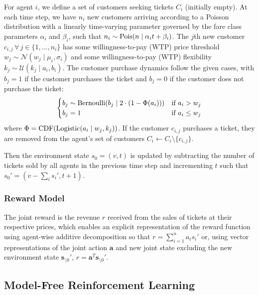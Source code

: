 \documentclass[letterpaper]{article}%
\begin{document}
For agent $i$, we define a set of customers seeking tickets $C_i$ (initially empty). At each time step, we have $n_i$ new customers arriving according to a Poisson distribution with a linearly time-varying parameter governed by the fare class parameters $\alpha_i$ and $\beta_i$, such that $n_i \sim \textnormal{Pois}(n \mid \alpha_i t+\beta_i)$. The $j$th new customer $c_{i,j} \, \forall \, j \in \{1, ..., n_i\}$ has some willingness-to-pay (WTP) price threshold $w_j \sim \mathcal{N}(w_j \mid \mu_i, \sigma_i)$ and some willingness-to-pay (WTP) flexibility $k_j \sim \mathcal{U}(k_j \mid a_i, b_i)$. The customer purchase dynamics follow the given cases, with $b_j = 1$ if the customer purchases the ticket and $b_j = 0$ if the customer does not purchase the ticket:
\begin{equation}
    \begin{cases}
      b_j \sim \textnormal{Bernoulli}(b_j \mid 2\cdot(1-\Phi(a_i))) & \text{if $a_i > w_j$}\\
      b_j = 1 & \text{if $a_i \leq w_j$}
    \end{cases}  \nonumber     
\end{equation}
where $\Phi = \textnormal{CDF}(\textnormal{Logistic}(a_i \mid w_j, k_j))$. If the customer $c_{i,j}$ purchases a ticket, they are removed from the agent's set of customers $C_i \leftarrow C_i \setminus \{c_{i,j}\}$.

Then the environment state $s_0 = (v, t)$ is updated by subtracting the number of tickets sold by all agents in the previous time step and incrementing $t$ such that $s_0'=(v-\sum_i s_i', t+1)$.

\subsubsection{Reward Model}

The joint reward is the revenue $r$ received from the sales of tickets at their respective prices, which enables an explicit representation of the reward function using agent-wise additive decomposition so that $r = \sum_{i=1}^n a_i s_i'$ or, using vector representations of the joint action $\textbf{a}$ and new joint state excluding the new environment state $\mathbf{s}_{\setminus 0}'$, $r = \textbf{a}^T\textbf{s}_{\setminus 0}'$. 

\subsection{Model-Free Reinforcement Learning}
\end{document}
